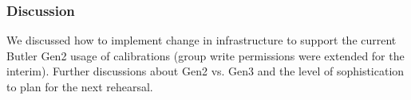 \subsubsection{Discussion}
We discussed how to implement change in infrastructure to support the current
Butler Gen2 usage of calibrations (group write permissions were extended for the
interim).  Further discussions about Gen2 vs. Gen3 and the level of sophistication
to plan for the next rehearsal.

